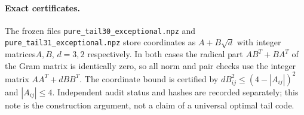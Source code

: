 \paragraph{Exact certificates.}
The frozen files \texttt{pure\_tail30\_exceptional.npz} and
\texttt{pure\_tail31\_exceptional.npz} store coordinates as $A+B\sqrt d$
with integer matrices$A,B$, $d=3,2$ respectively. In both cases the
radical part $AB^T+BA^T$ of the Gram matrix is identically zero, so all
norm and pair checks use the integer matrix $AA^T+dBB^T$.
The coordinate bound is certified by
$dB_{ij}^2\leq(4-|A_{ij}|)^2$ and $|A_{ij}|\leq4$.
Independent audit status and hashes are recorded separately; this note
is the construction argument, not a claim of a universal optimal tail code.
